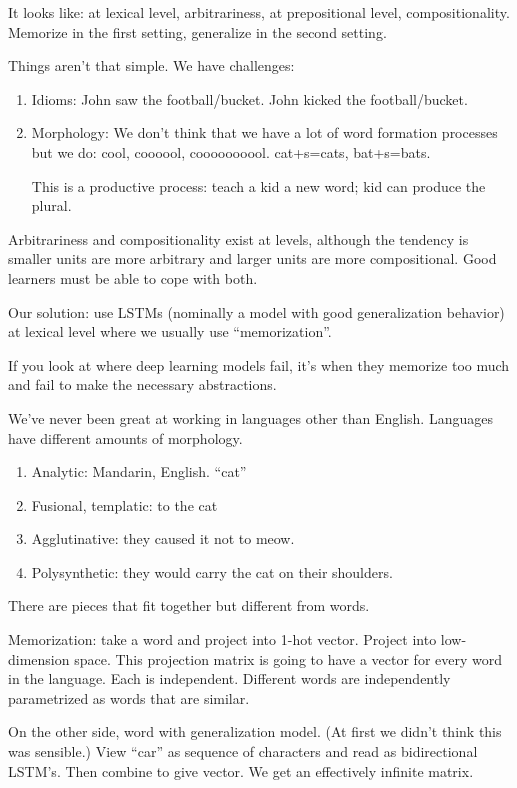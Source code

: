 It looks like: at lexical level, arbitrariness, at prepositional level, compositionality. Memorize in the first setting, generalize in the second setting.

Things aren't that simple. We have challenges:
\begin{enumerate}
\item
Idioms: John saw the football/bucket. John kicked the football/bucket.
\item
Morphology: We don't think that we have a lot of word formation processes but we do: cool, coooool, coooooooool. cat+s=cats, bat+s=bats.

This is a productive process: teach a kid a new word; kid can produce the plural.
\end{enumerate}
Arbitrariness and compositionality exist at levels, although the tendency is smaller units are more arbitrary and larger units are more compositional. Good learners must be able to cope with both.

Our solution: use LSTMs (nominally a model with good generalization behavior) at lexical level where we usually use ``memorization''. 

If you look at where deep learning models fail, it's when they memorize too much and fail to make the necessary abstractions.

We've never been great at working in languages other than English. Languages have different amounts of morphology. 
\begin{enumerate}
\item
Analytic: Mandarin, English. ``cat''
\item
Fusional, templatic: to the cat
\item
Agglutinative: they caused it not to meow.
\item
Polysynthetic: they would carry the cat on their shoulders.
\end{enumerate}
There are pieces that fit together but different from words.

Memorization: take a word and project into 1-hot vector.
Project into low-dimension space. This projection matrix is going to have a vector for every word in the language. Each is independent. Different words are independently parametrized as words that are similar.

On the other side, word with generalization model. (At first we didn't think this was sensible.) View ``car'' as sequence of characters and read as bidirectional LSTM's. Then combine to give vector. We get an effectively infinite matrix.

